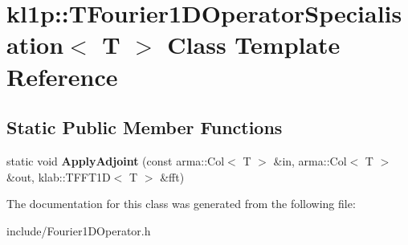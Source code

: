 \hypertarget{classkl1p_1_1TFourier1DOperatorSpecialisation}{}\section{kl1p\+:\+:T\+Fourier1\+D\+Operator\+Specialisation$<$ T $>$ Class Template Reference}
\label{classkl1p_1_1TFourier1DOperatorSpecialisation}
\subsection*{Static Public Member Functions}
\begin{DoxyCompactItemize}
\item 
static void {\bfseries Apply\+Adjoint} (const arma\+::\+Col$<$ T $>$ \&in, arma\+::\+Col$<$ T $>$ \&out, klab\+::\+T\+F\+F\+T1D$<$ T $>$ \&fft)\hypertarget{classkl1p_1_1TFourier1DOperatorSpecialisation_a1c674c79f72d7833ca5067bdd9888db5}{}\label{classkl1p_1_1TFourier1DOperatorSpecialisation_a1c674c79f72d7833ca5067bdd9888db5}

\end{DoxyCompactItemize}


The documentation for this class was generated from the following file\+:\begin{DoxyCompactItemize}
\item 
include/Fourier1\+D\+Operator.\+h\end{DoxyCompactItemize}
